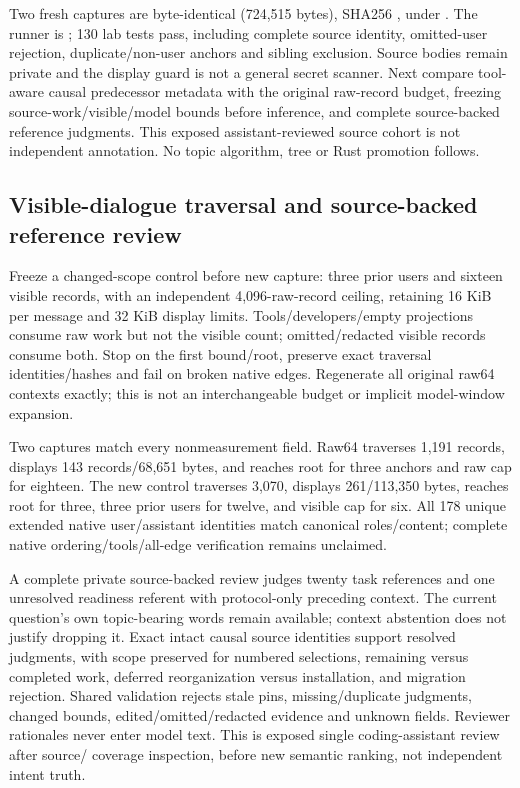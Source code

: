 \documentclass[11pt]{article}
\begin{document}
Two fresh captures are byte-identical (724,515 bytes), SHA256
,
under . The runner is
; 130 lab tests pass, including complete source identity,
omitted-user rejection, duplicate/non-user anchors and sibling exclusion.
Source bodies remain private and the display guard is not a general secret scanner.
Next compare tool-aware causal predecessor metadata with the original raw-record
budget, freezing source-work/visible/model bounds before inference, and complete
source-backed reference judgments. This exposed assistant-reviewed source cohort
is not independent annotation. No topic algorithm, tree or Rust promotion follows.

\subsection{Visible-dialogue traversal and source-backed reference review}
Freeze a changed-scope control before new capture: three prior users and sixteen
visible records, with an independent 4,096-raw-record ceiling, retaining 16 KiB
per message and 32 KiB display limits. Tools/developers/empty projections consume
raw work but not the visible count; omitted/redacted visible records consume
both. Stop on the first bound/root, preserve exact traversal identities/hashes
and fail on broken native edges. Regenerate all original raw64 contexts exactly;
this is not an interchangeable budget or implicit model-window expansion.

Two captures match every nonmeasurement field. Raw64 traverses 1,191 records,
displays 143 records/68,651 bytes, and reaches root for three anchors and raw cap
for eighteen. The new control traverses 3,070, displays 261/113,350 bytes, reaches
root for three, three prior users for twelve, and visible cap for six. All 178
unique extended native user/assistant identities match canonical roles/content;
complete native ordering/tools/all-edge verification remains unclaimed.

A complete private source-backed review judges twenty task references and one
unresolved readiness referent with protocol-only preceding context. The current
question's own topic-bearing words remain available; context abstention does not
justify dropping it. Exact intact causal source identities support resolved
judgments, with scope preserved for numbered selections, remaining versus completed
work, deferred reorganization versus installation, and migration rejection.
Shared validation rejects stale pins, missing/duplicate judgments, changed bounds,
edited/omitted/redacted evidence and unknown fields. Reviewer rationales never
enter model text. This is exposed single coding-assistant review after source/
coverage inspection, before new semantic ranking, not independent intent truth.
\end{document}
